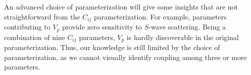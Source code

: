 

An advanced choice of parameterization will give some insights that are not straightforward from the $C_{ij}$ parameterization. For example, parameters contributing to $V_p$ provide zero sensitivity to $S$-wave scattering. Being a combination of nine $C_{ij}$ parameters, $V_p$ is hardly discoverable in the original parameterization. Thus, our knowledge is still limited by the choice of parameterization, as we cannot visually identify coupling among three or more parameters.
